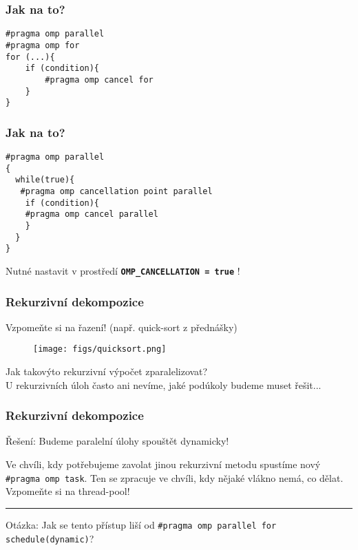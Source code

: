 \documentclass[usenames,dvipsnames,9pt]{beamer}
\begin{document}
{
\begin{frame}[fragile]
	\frametitle{Jak na to?}

  \begin{verbatim}
#pragma omp parallel
#pragma omp for
for (...){
    if (condition){
    	#pragma omp cancel for 
    }
}
  \end{verbatim}
\end{frame}

\begin{frame}[fragile]
	\frametitle{Jak na to?}
  \begin{verbatim}
#pragma omp parallel
{
  while(true){
   #pragma omp cancellation point parallel
    if (condition){
    #pragma omp cancel parallel
    }
  }
}
  \end{verbatim}
  
  \vspace{1em}
  {\Large \faWarning \hspace{3pt} Nutné nastavit v prostředí \texttt{\textbf{OMP\_CANCELLATION = true}} !}

  
  
\end{frame}
}

\begin{frame}[fragile]
	\frametitle{Rekurzivní dekompozice}


	\hfill Vzpomeňte si na řazení! (např. quick-sort z přednášky)

	\begin{figure}
		\centering\texttt{[image: figs/quicksort.png]}
	\end{figure}

	\pause\vspace{2em}

	\begin{center}
		{\Large Jak takovýto rekurzivní výpočet zparalelizovat?}\\
		U rekurzivních úloh často ani nevíme, jaké podúkoly budeme muset řešit...
	\end{center}
\end{frame}

\begin{frame}
	\frametitle{Rekurzivní dekompozice}

	{\Large Řešení: Budeme paralelní úlohy spouštět dynamicky!}

	\hfill\begin{minipage}{0.8\linewidth}
	  Ve chvíli, kdy potřebujeme zavolat jinou rekurzivní metodu spustíme nový \texttt{\#pragma omp task}.
	  Ten se zpracuje ve chvíli, kdy nějaké vlákno nemá, co dělat.
	  Vzpomeňte si na thread-pool!
  \end{minipage}

  \pause
  \vspace{2em}\hrule\vspace{2em}

  Otázka: Jak se tento přístup liší od \texttt{\#pragma omp parallel for schedule(dynamic)}?
\end{frame}
\end{document}
